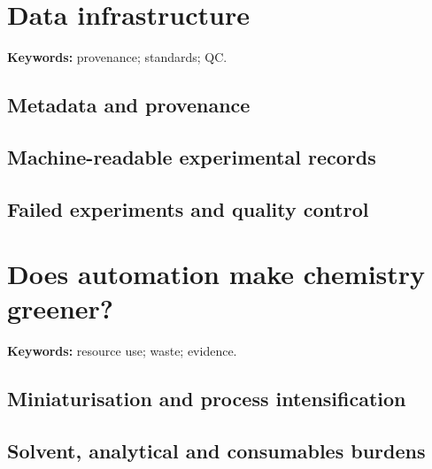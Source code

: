 \section{Data infrastructure}

\begin{warningbox}
\textbf{Keywords:} provenance; standards; QC.
\end{warningbox}

\subsection{Metadata and provenance}


\subsection{Machine-readable experimental records}


\subsection{Failed experiments and quality control}


\section{Does automation make chemistry greener?}

\begin{insightbox}
\textbf{Keywords:} resource use; waste; evidence.
\end{insightbox}

\subsection{Miniaturisation and process intensification}


\subsection{Solvent, analytical and consumables burdens}


